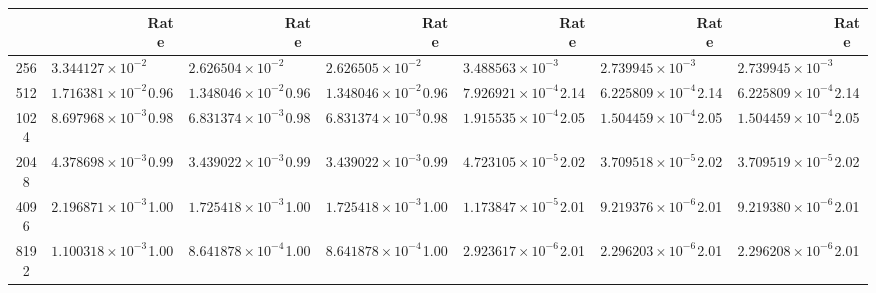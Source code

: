 \documentclass{article}
\begin{document}
\begin{tabular}[]{|c||c|c|c|c|c|c||c|c|c|c|c|c|}
    &&Rate&&Rate&&Rate&&Rate&&Rate&&Rate 
    \\
    \hline
    256&$3.344127\times{10}^{-2}$&&$2.626504\times{10}^{-2}$&&$2.626505\times{10}^{-2}$&
       &$3.488563\times{10}^{-3}$&&$2.739945\times{10}^{-3}$&&$2.739945\times{10}^{-3}$
    \\
    \hline
    512&$1.716381\times{10}^{-2}$&0.96&$1.348046\times{10}^{-2}$&0.96&$1.348046\times{10}^{-2}$&0.96
       &$7.926921\times{10}^{-4}$&2.14&$6.225809\times{10}^{-4}$&2.14&$6.225809\times{10}^{-4}$&2.14
    \\
    \hline
    1024&$8.697968\times{10}^{-3}$&0.98&$6.831374\times{10}^{-3}$&0.98&$6.831374\times{10}^{-3}$&0.98
        &$1.915535\times{10}^{-4}$&2.05&$1.504459\times{10}^{-4}$&2.05&$1.504459\times{10}^{-4}$&2.05
    \\
    \hline
    2048&$4.378698\times{10}^{-3}$&0.99&$3.439022\times{10}^{-3}$&0.99&$3.439022\times{10}^{-3}$&0.99
        &$4.723105\times{10}^{-5}$&2.02&$3.709518\times{10}^{-5}$&2.02&$3.709519\times{10}^{-5}$&2.02
    \\
    \hline
    4096&$2.196871\times{10}^{-3}$&1.00&$1.725418\times{10}^{-3}$&1.00&$1.725418\times{10}^{-3}$&1.00
        &$1.173847\times{10}^{-5}$&2.01&$9.219376\times{10}^{-6}$&2.01&$9.219380\times{10}^{-6}$&2.01
    \\
    \hline
    8192&$1.100318\times{10}^{-3}$&1.00&$8.641878\times{10}^{-4}$&1.00&$8.641878\times{10}^{-4}$&1.00
        &$2.923617\times{10}^{-6}$&2.01&$2.296203\times{10}^{-6}$&2.01&$2.296208\times{10}^{-6}$&2.01
    \\
    \hline
  \end{tabular}      
\end{document}
